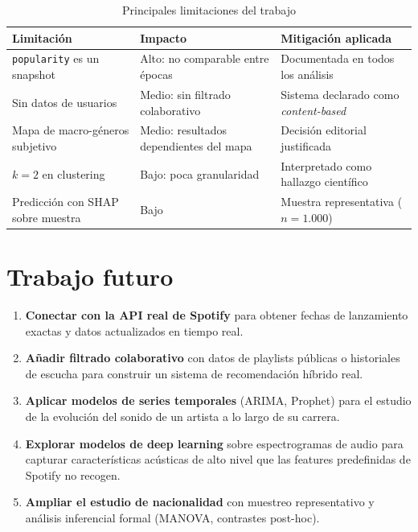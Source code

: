 \documentclass[12pt, a4paper, twoside]{book}
\theoremstyle{definition}
\begin{document}
\begin{table}[H]
\centering
\caption{Principales limitaciones del trabajo}
\label{tab:limitaciones}
\small
{}
\begin{tabular}{p{4cm}p{4cm}p{5cm}}
\toprule
\textbf{Limitación} & \textbf{Impacto} & \textbf{Mitigación aplicada} \\
\midrule
\texttt{popularity} es un snapshot & Alto: no comparable entre épocas &
Documentada en todos los análisis \\
Sin datos de usuarios & Medio: sin filtrado colaborativo &
Sistema declarado como \textit{content-based} \\
Mapa de macro-géneros subjetivo & Medio: resultados dependientes del mapa &
Decisión editorial justificada \\
$k=2$ en clustering & Bajo: poca granularidad & Interpretado como hallazgo científico \\
Predicción con SHAP sobre muestra & Bajo & Muestra representativa ($n=1.000$) \\
\bottomrule
\end{tabular}
\end{table}

\section{Trabajo futuro}

\begin{enumerate}
  \item \textbf{Conectar con la API real de Spotify} para obtener fechas de
        lanzamiento exactas y datos actualizados en tiempo real.
  \item \textbf{Añadir filtrado colaborativo} con datos de playlists públicas
        o historiales de escucha para construir un sistema de recomendación
        híbrido real.
  \item \textbf{Aplicar modelos de series temporales} (ARIMA, Prophet) para el
        estudio de la evolución del sonido de un artista a lo largo de su carrera.
  \item \textbf{Explorar modelos de deep learning} sobre espectrogramas de audio
        para capturar características acústicas de alto nivel que las features
        predefinidas de Spotify no recogen.
  \item \textbf{Ampliar el estudio de nacionalidad} con muestreo representativo
        y análisis inferencial formal (MANOVA, contrastes post-hoc).
\end{enumerate}
\end{document}
